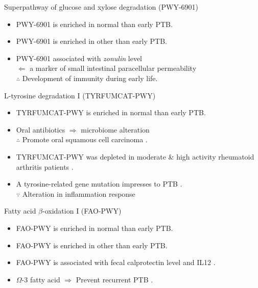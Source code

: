 \documentclass{beamer}
\begin{document}
\begin{frame}[allowframebreaks]
        \begin{block}{Superpathway of glucose and xylose degradation (PWY-6901)}
            \begin{itemize}
                \item PWY-6901 is enriched in normal than early PTB.
                \item PWY-6901 is enriched in other than early PTB.
                \item PWY-6901 associated with \textit{zonulin} level \cite{PWY-6901-1} \\
                    $\Leftarrow$ a marker of small intestinal paracellular permeability \\
                    $\therefore$ Development of immunity during early life.
            \end{itemize}
        \end{block}

        \begin{block}{L-tyrosine degradation I (TYRFUMCAT-PWY)}
            \begin{itemize}
                \item TYRFUMCAT-PWY is enriched in normal than early PTB.
                \item Oral antibiotics $\Rightarrow$ microbiome alteration \\
                    $\therefore$ Promote oral squamous cell carcinoma \cite{TYRFUMCAT-PWY-1}.
                \item TYRFUMCAT-PWY was depleted in moderate \& high activity rheumatoid arthritis patients \cite{TYRFUMCAT-PWY-2}.
                \item A tyrosine-related gene mutation impresses to PTB \cite{TYRFUMCAT-PWY-3}. \\
                    $\because$ Alteration in inflammation response
            \end{itemize}
        \end{block}

        \begin{block}{Fatty acid $\beta$-oxidation I (FAO-PWY)}
            \begin{itemize}
                \item FAO-PWY is enriched in normal than early PTB.
                \item FAO-PWY is enriched in other than early PTB.
                \item FAO-PWY is associated with fecal calprotectin level and IL12 \cite{FAO-PWY-2}.
                \item $\Omega$-3 fatty acid $\Rightarrow$ Prevent recurrent PTB \cite{FAO-PWY-1}.
            \end{itemize}
        \end{block}


\end{frame}
\end{document}
